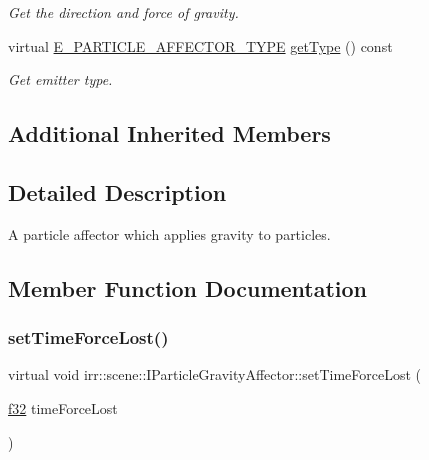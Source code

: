 \begin{DoxyCompactItemize}
\begin{DoxyCompactList}\small\item\em Get the direction and force of gravity. \end{DoxyCompactList}\item 
\mbox{\label{classirr_1_1scene_1_1IParticleGravityAffector_a60a002206e1fa758137f92b8dc390b7c}} 
virtual \hyperlink{namespaceirr_1_1scene_a34c0f9475cfcbda8b50ad816a046010b}{E\+\_\+\+P\+A\+R\+T\+I\+C\+L\+E\+\_\+\+A\+F\+F\+E\+C\+T\+O\+R\+\_\+\+T\+Y\+PE} \hyperlink{classirr_1_1scene_1_1IParticleGravityAffector_a60a002206e1fa758137f92b8dc390b7c}{get\+Type} () const
\begin{DoxyCompactList}\small\item\em Get emitter type. \end{DoxyCompactList}\end{DoxyCompactItemize}
\subsection*{Additional Inherited Members}


\subsection{Detailed Description}
A particle affector which applies gravity to particles. 

\subsection{Member Function Documentation}
\mbox{\label{classirr_1_1scene_1_1IParticleGravityAffector_a3910d872c740e678373cecbd5523ad38}} 
\subsubsection{\texorpdfstring{set\+Time\+Force\+Lost()}{setTimeForceLost()}}
{\footnotesize\ttfamily virtual void irr\+::scene\+::\+I\+Particle\+Gravity\+Affector\+::set\+Time\+Force\+Lost (\begin{DoxyParamCaption}\item[{\hyperlink{namespaceirr_a0277be98d67dc26ff93b1a6a1d086b07}{f32}}]{time\+Force\+Lost }\end{DoxyParamCaption})\hspace{0.3cm}{\ttfamily [pure virtual]}}



